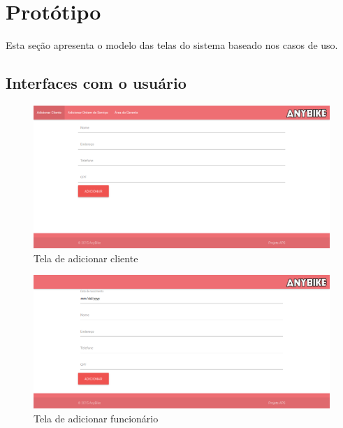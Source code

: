 \documentclass[
	12pt,				%
	openright,
	oneside,			%
	a4paper,			%
	chapter=TITLE,		%
	brazil				%
	]{abntex2}
\begin{document}
\newpage
\chapter{Protótipo}

Esta seção apresenta o modelo das telas do sistema baseado nos casos de uso.

\section{Interfaces com o usuário}

\begin{figure}[htb]
	\caption{Tela de adicionar cliente}
	\begin{center}
	    \includegraphics[scale=0.3]{Arquivos/adicionar_cliente}  
	\end{center}
\end{figure}


\begin{figure}[htb]
	\caption{Tela de adicionar funcionário}
	\begin{center}
	    \includegraphics[scale=0.3]{Arquivos/adicionar_funcionario}  
	\end{center}
\end{figure}
\end{document}
